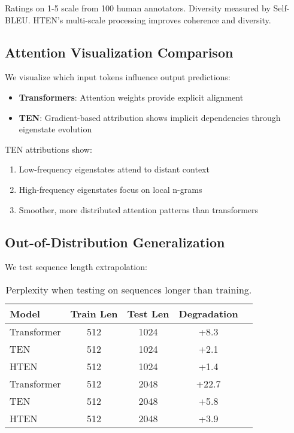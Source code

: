 \documentclass[11pt,letterpaper]{article}
\begin{document}
Ratings on 1-5 scale from 100 human annotators. Diversity measured by Self-BLEU. HTEN's multi-scale processing improves coherence and diversity.

\subsection{Attention Visualization Comparison}

We visualize which input tokens influence output predictions:

\begin{itemize}
    \item \textbf{Transformers}: Attention weights provide explicit alignment
    \item \textbf{TEN}: Gradient-based attribution shows implicit dependencies through eigenstate evolution
\end{itemize}

TEN attributions show:
\begin{enumerate}
    \item Low-frequency eigenstates attend to distant context
    \item High-frequency eigenstates focus on local n-grams
    \item Smoother, more distributed attention patterns than transformers
\end{enumerate}

\subsection{Out-of-Distribution Generalization}

We test sequence length extrapolation:

\begin{table}[h]
\centering
\caption{Perplexity when testing on sequences longer than training.}
\begin{tabular}{lcccc}
\toprule
\textbf{Model} & \textbf{Train Len} & \textbf{Test Len} & \textbf{Degradation} \\
\midrule
Transformer & 512 & 1024 & +8.3 \\
TEN & 512 & 1024 & +2.1 \\
HTEN & 512 & 1024 & +1.4 \\
\midrule
Transformer & 512 & 2048 & +22.7 \\
TEN & 512 & 2048 & +5.8 \\
HTEN & 512 & 2048 & +3.9 \\
\bottomrule
\end{tabular}
\end{table}
\end{document}

